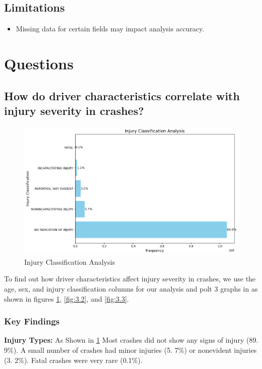 \documentclass[a4paper,12pt]{article}
\begin{document}
\subsection{Limitations}
\begin{itemize}
    \item Missing data for certain fields may impact analysis accuracy.

\end{itemize}


\newpage
\section{Questions}

\subsection{How do driver characteristics correlate with injury severity in crashes?}

\begin{figure}
    \centering
    \includegraphics[width=0.75\linewidth]{images/injury-classification-analysis.png}
    \caption{Injury Classification Analysis}
    \label{fig:3.1}
\end{figure}

To find out how driver characteristics affect injury severity in crashes, we use the age, sex, and injury classification columns for our analysis and polt 3 graphs in as shown in figures \ref{fig:3.1}, \ref{fig:3.2}, and \ref{fig:3.3}.
\subsubsection{Key Findings}

\textbf{Injury Types:}
As Shown in \ref{fig:3.1} Most crashes did not show any signs of injury (89. 9\%). A small number of crashes had minor injuries (5. 7\%) or nonevident injuries (3. 2\%). Fatal crashes were very rare (0.1\%).
\end{document}
